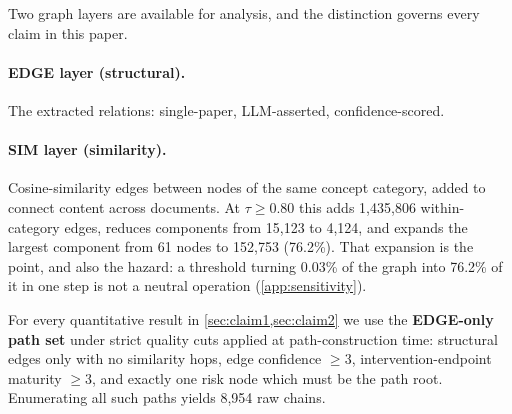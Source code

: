 \documentclass[10pt,twocolumn,letterpaper]{article}
\begin{document}
Two graph layers are available for analysis, and the distinction governs every
claim in this paper.

\paragraph{EDGE layer (structural).} The extracted relations: single-paper,
LLM-asserted, confidence-scored.

\paragraph{SIM layer (similarity).} Cosine-similarity edges between nodes of the
same concept category, added to connect content across documents. At
$\tau \geq 0.80$ this adds 1{,}435{,}806 within-category edges, reduces components
from 15{,}123 to 4{,}124, and expands the largest component from 61 nodes to
152{,}753 (76.2\%). That expansion is the point, and also the hazard: a threshold
turning 0.03\% of the graph into 76.2\% of it in one step is not a neutral
operation (\cref{app:sensitivity}).

For every quantitative result in \cref{sec:claim1,sec:claim2} we use the
\textbf{EDGE-only path set} under strict quality cuts applied at
path-construction time: structural edges only with no similarity hops, edge
confidence $\geq 3$, intervention-endpoint maturity $\geq 3$, and exactly one
risk node which must be the path root. Enumerating all such paths yields 8{,}954
raw chains.
\end{document}
